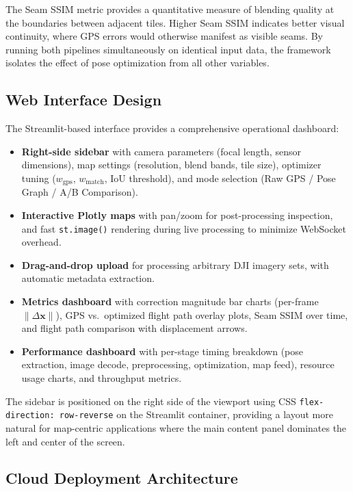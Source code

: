 \documentclass[conference]{IEEEtran}
\begin{document}
The Seam SSIM metric provides a quantitative measure of blending quality at the boundaries between adjacent tiles. Higher Seam SSIM indicates better visual continuity, where GPS errors would otherwise manifest as visible seams. By running both pipelines simultaneously on identical input data, the framework isolates the effect of pose optimization from all other variables.

\subsection{Web Interface Design}

The Streamlit-based interface provides a comprehensive operational dashboard:

\begin{itemize}
    \item \textbf{Right-side sidebar} with camera parameters (focal length, sensor dimensions), map settings (resolution, blend bands, tile size), optimizer tuning ($w_{\text{gps}}$, $w_{\text{match}}$, IoU threshold), and mode selection (Raw GPS / Pose Graph / A/B Comparison).
    \item \textbf{Interactive Plotly maps} with pan/zoom for post-processing inspection, and fast \texttt{st.image()} rendering during live processing to minimize WebSocket overhead.
    \item \textbf{Drag-and-drop upload} for processing arbitrary DJI imagery sets, with automatic metadata extraction.
    \item \textbf{Metrics dashboard} with correction magnitude bar charts (per-frame $\|\Delta\mathbf{x}\|$), GPS vs.\ optimized flight path overlay plots, Seam SSIM over time, and flight path comparison with displacement arrows.
    \item \textbf{Performance dashboard} with per-stage timing breakdown (pose extraction, image decode, preprocessing, optimization, map feed), resource usage charts, and throughput metrics.
\end{itemize}

The sidebar is positioned on the right side of the viewport using CSS \texttt{flex-direction: row-reverse} on the Streamlit container, providing a layout more natural for map-centric applications where the main content panel dominates the left and center of the screen.

\subsection{Cloud Deployment Architecture}
\end{document}
